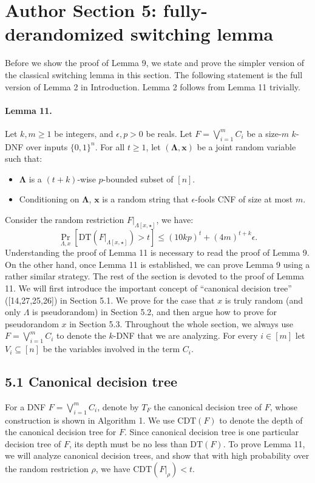 \section*{Author Section 5: fully-derandomized switching lemma}
Before we show the proof of Lemma 9, we state and prove the simpler version of the classical switching lemma in this section. The following statement is the full version of Lemma 2 in Introduction. Lemma 2 follows from Lemma 11 trivially.
\paragraph{Lemma 11.} Let $k,m\ge1$ be integers, and $\epsilon,p>0$ be reals. Let $F=\bigvee_{i=1}^mC_i$ be a size-$m$ $k$-DNF over inputs $\{0,1\}^n$. For all $t\ge1$, let $(\boldsymbol\Lambda,\boldsymbol x)$ be a joint random variable such that:
\begin{itemize}\item $\boldsymbol\Lambda$ is a $(t+k)$-wise $p$-bounded subset of $[n]$.
\item Conditioning on $\boldsymbol\Lambda$, $\boldsymbol x$ is a random string that $\epsilon$-fools CNF of size at most $m$.\end{itemize}
Consider the random restriction $F|_{\Lambda[x,\star]}$, we have:
\[\Pr_{\Lambda,x}[\mathrm{DT}(F|_{\Lambda[x,\star]})>t]\le(10kp)^t+(4m)^{t+k}\epsilon.\]
Understanding the proof of Lemma 11 is necessary to read the proof of Lemma 9. On the other hand, once Lemma 11 is established, we can prove Lemma 9 using a rather similar strategy. The rest of the section is devoted to the proof of Lemma 11. We will first introduce the important concept of ``canonical decision tree'' ([14,27,25,26]) in Section 5.1. We prove for the case that $x$ is truly random (and only $\Lambda$ is pseudorandom) in Section 5.2, and then argue how to prove for pseudorandom $x$ in Section 5.3. Throughout the whole section, we always use $F=\bigvee_{i=1}^mC_i$ to denote the $k$-DNF that we are analyzing. For every $i\in[m]$ let $V_i\subseteq[n]$ be the variables involved in the term $C_i$.
\subsection*{5.1 Canonical decision tree}
For a DNF $F=\bigvee_{i=1}^mC_i$, denote by $T_F$ the canonical decision tree of $F$, whose construction is shown in Algorithm 1. We use $\mathrm{CDT}(F)$ to denote the depth of the canonical decision tree for $F$. Since canonical decision tree is one particular decision tree of $F$, its depth must be no less than $\mathrm{DT}(F)$. To prove Lemma 11, we will analyze canonical decision trees, and show that with high probability over the random restriction $\rho$, we have $\mathrm{CDT}(F|_\rho)<t$.
